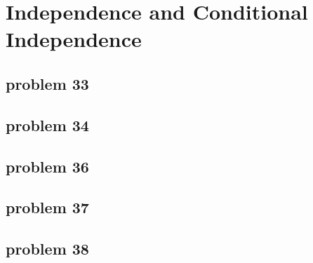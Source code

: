 \section{Independence and Conditional Independence}

\subsection{problem 33}


\subsection{problem 34}


\subsection{problem 36}


\subsection{problem 37}


\subsection{problem 38}



